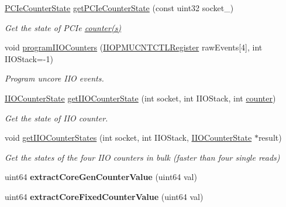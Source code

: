 \begin{DoxyCompactItemize}
\item 
\mbox{\hyperlink{class_simple_counter_state}{P\+C\+Ie\+Counter\+State}} \mbox{\hyperlink{class_p_c_m_a3b1b549672af4c14c00eb7d461c87ac4}{get\+P\+C\+Ie\+Counter\+State}} (const uint32 socket\+\_\+)
\begin{DoxyCompactList}\small\item\em Get the state of P\+C\+Ie \mbox{\hyperlink{structcounter}{counter(s)}} \end{DoxyCompactList}\item 
void \mbox{\hyperlink{class_p_c_m_ac75fcae283d8c6f0ef7085a913685f0b}{program\+I\+I\+O\+Counters}} (\mbox{\hyperlink{struct_i_i_o_p_m_u_c_n_t_c_t_l_register}{I\+I\+O\+P\+M\+U\+C\+N\+T\+C\+T\+L\+Register}} raw\+Events\mbox{[}4\mbox{]}, int I\+I\+O\+Stack=-\/1)
\begin{DoxyCompactList}\small\item\em Program uncore I\+IO events. \end{DoxyCompactList}\item 
\mbox{\hyperlink{class_simple_counter_state}{I\+I\+O\+Counter\+State}} \mbox{\hyperlink{class_p_c_m_a85e2036c24c34ab5eecce856382d19fb}{get\+I\+I\+O\+Counter\+State}} (int socket, int I\+I\+O\+Stack, int \mbox{\hyperlink{structcounter}{counter}})
\begin{DoxyCompactList}\small\item\em Get the state of I\+IO counter. \end{DoxyCompactList}\item 
void \mbox{\hyperlink{class_p_c_m_a25e8b223197728858a704d53b8ab5534}{get\+I\+I\+O\+Counter\+States}} (int socket, int I\+I\+O\+Stack, \mbox{\hyperlink{class_simple_counter_state}{I\+I\+O\+Counter\+State}} $\ast$result)
\begin{DoxyCompactList}\small\item\em Get the states of the four I\+IO counters in bulk (faster than four single reads) \end{DoxyCompactList}\item 
\mbox{\label{class_p_c_m_abe37e4fcbf856df75c9fbdd83d9054a1}} 
uint64 {\bfseries extract\+Core\+Gen\+Counter\+Value} (uint64 val)
\item 
\mbox{\label{class_p_c_m_a9efedba414c4b01207e6d57dc83dd66a}} 
uint64 {\bfseries extract\+Core\+Fixed\+Counter\+Value} (uint64 val)
\item 
\mbox{\label{class_p_c_m_abad9ccfca970ae03229377926df029cc}} 

\end{DoxyCompactItemize}
